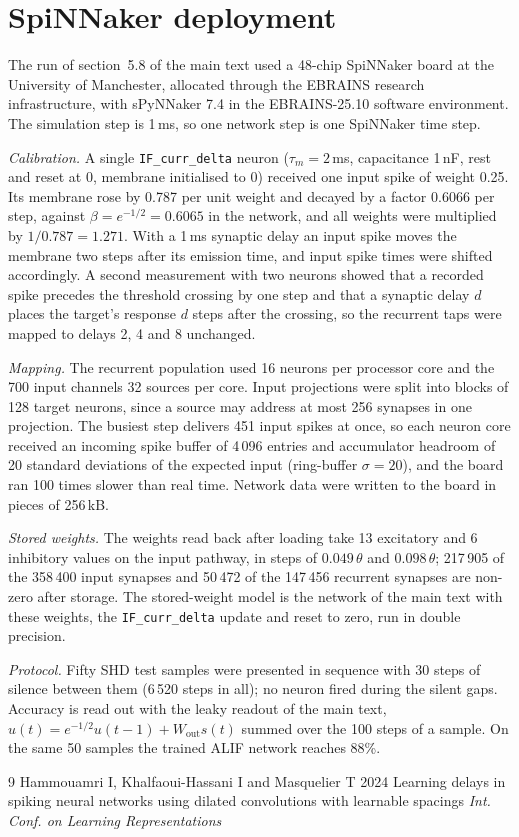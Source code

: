 \documentclass{iopjournal}
\begin{document}
\section{SpiNNaker deployment}

The run of section~5.8 of the main text used a 48-chip SpiNNaker board at the University of Manchester, allocated through the EBRAINS research infrastructure, with sPyNNaker 7.4 in the EBRAINS-25.10 software environment. The simulation step is 1\,ms, so one network step is one SpiNNaker time step.

\textit{Calibration.} A single \texttt{IF\_curr\_delta} neuron ($\tau_m=2$\,ms, capacitance 1\,nF, rest and reset at 0, membrane initialised to 0) received one input spike of weight 0.25. Its membrane rose by 0.787 per unit weight and decayed by a factor 0.6066 per step, against $\beta=e^{-1/2}=0.6065$ in the network, and all weights were multiplied by $1/0.787=1.271$. With a 1\,ms synaptic delay an input spike moves the membrane two steps after its emission time, and input spike times were shifted accordingly. A second measurement with two neurons showed that a recorded spike precedes the threshold crossing by one step and that a synaptic delay $d$ places the target's response $d$ steps after the crossing, so the recurrent taps were mapped to delays 2, 4 and 8 unchanged.

\textit{Mapping.} The recurrent population used 16 neurons per processor core and the 700 input channels 32 sources per core. Input projections were split into blocks of 128 target neurons, since a source may address at most 256 synapses in one projection. The busiest step delivers 451 input spikes at once, so each neuron core received an incoming spike buffer of 4\,096 entries and accumulator headroom of 20 standard deviations of the expected input (ring-buffer $\sigma=20$), and the board ran 100 times slower than real time. Network data were written to the board in pieces of 256\,kB.

\textit{Stored weights.} The weights read back after loading take 13 excitatory and 6 inhibitory values on the input pathway, in steps of $0.049\,\theta$ and $0.098\,\theta$; 217\,905 of the 358\,400 input synapses and 50\,472 of the 147\,456 recurrent synapses are non-zero after storage. The stored-weight model is the network of the main text with these weights, the \texttt{IF\_curr\_delta} update and reset to zero, run in double precision.

\textit{Protocol.} Fifty SHD test samples were presented in sequence with 30 steps of silence between them (6\,520 steps in all); no neuron fired during the silent gaps. Accuracy is read out with the leaky readout of the main text, $u(t)=e^{-1/2}u(t-1)+W_{\mathrm{out}}s(t)$ summed over the 100 steps of a sample. On the same 50 samples the trained ALIF network reaches 88\%.

\begin{thebibliography}{9}
 Hammouamri I, Khalfaoui-Hassani I and Masquelier T 2024 Learning delays in spiking neural networks using dilated convolutions with learnable spacings \textit{Int. Conf. on Learning Representations}
\end{thebibliography}
\end{document}
